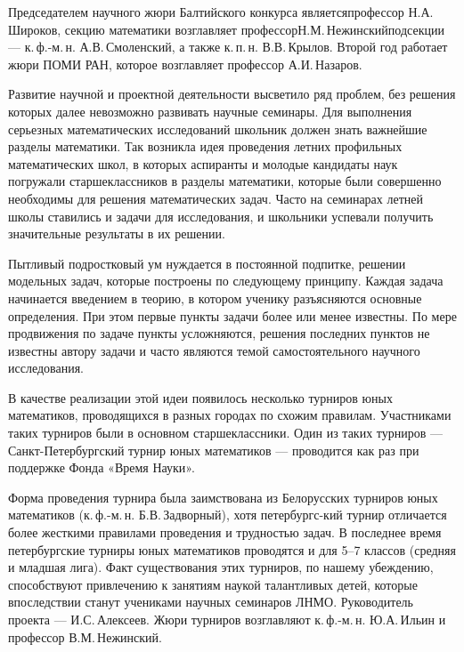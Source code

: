 \ms\abz Председателем научного жюри Балтийского конкурса является\linebreak профессор Н.А. Широков, секцию математики возглавляет профессор\linebreak Н.М.\,Нежинский\scolon подсекции — к.\,ф.-м.\,н. А.В.\,Смоленский, а также к.\,п.\,н. В.В.\,Крылов. Второй год работает жюри ПОМИ РАН, которое возглавляет профессор А.И.\,Назаров.

\ms\abz Развитие научной и проектной деятельности высветило ряд проблем, без решения которых далее невозможно развивать научные семинары. Для выполнения серьезных математических исследований школьник должен знать важнейшие разделы математики. Так возникла идея проведения летних профильных математических школ, в которых аспиранты и молодые кандидаты наук погружали старшеклассников в разделы математики, которые были совершенно необходимы для решения математических задач. Часто на семинарах летней школы ставились и задачи для исследования, и школьники успевали получить значительные результаты в их решении. 

\ms\abz Пытливый подростковый ум нуждается в постоянной подпитке, решении модельных задач, которые построены по следующему принципу. Каждая задача начинается введением в теорию, в котором ученику разъясняются основные определения. При этом первые пункты задачи более или менее известны. По мере продвижения по задаче пункты усложняются, решения последних пунктов не известны автору задачи и часто являются темой самостоятельного научного исследования.

\ms\abz В качестве реализации этой идеи появилось несколько турниров юных математиков, проводящихся в разных городах по схожим правилам. Участниками таких турниров были в основном старшеклассники. Один из таких турниров — Санкт-Петербургский турнир юных математиков — проводится как раз при поддержке Фонда «Время Науки».

\ms\abz Форма проведения турнира была заимствована из Белорусских турниров юных математиков (к.\,ф.-м.\,н. Б.В.\,Задворный), хотя петербургс-\linebreak кий турнир отличается более жесткими правилами проведения и трудностью задач. В последнее время петербургские турниры юных математиков проводятся и для 5–7 классов (средняя и младшая лига). Факт существования этих турниров, по нашему убеждению, способствуют привлечению к занятиям наукой талантливых детей, которые впоследствии станут учениками научных семинаров ЛНМО. Руководитель проекта — И.С.\,Алексеев. Жюри турниров возглавляют к.\,ф.-м.\,н. Ю.А.\,Ильин и профессор В.М.\,Нежинский.

